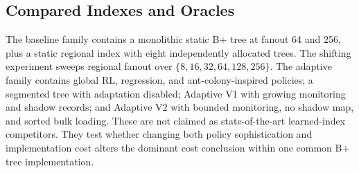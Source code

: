 \documentclass[sigconf,review,anonymous]{acmart}
\begin{document}
\begin{table}[t]
\centering
\caption{Principal experimental parameters.}
\label{tab:parameters-main}
\end{table}

\subsection{Compared Indexes and Oracles}

The baseline family contains a monolithic static B+ tree at fanout 64 and 256,
plus a static regional index with eight independently allocated trees.  The
shifting experiment sweeps regional fanout over
\(\{8,16,32,64,128,256\}\).  The adaptive family contains global RL,
regression, and ant-colony-inspired policies; a segmented tree with adaptation
disabled; Adaptive V1 with growing monitoring and shadow records; and Adaptive
V2 with bounded monitoring, no shadow map, and sorted bulk loading.  These are
not claimed as state-of-the-art learned-index competitors.  They test whether
changing both policy sophistication and implementation cost alters the dominant
cost conclusion within one common B+ tree implementation.
\end{document}
